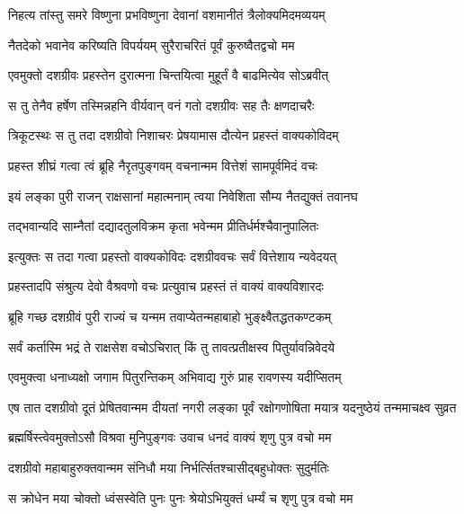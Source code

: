 \twolineshloka
{निहत्य तांस्तु समरे विष्णुना प्रभविष्णुना}
{देवानां वशमानीतं त्रैलोक्यमिदमव्ययम्} %

\twolineshloka
{नैतदेको भवानेव करिष्यति विपर्ययम्}
{सुरैराचरितं पूर्वं कुरुष्वैतद्वचो मम} %

\twolineshloka
{एवमुक्तो दशग्रीवः प्रहस्तेन दुरात्मना}
{चिन्तयित्वा मुहूर्तं वै बाढमित्येव सोऽब्रवीत्} %

\twolineshloka
{स तु तेनैव हर्षेण तस्मिन्नहनि वीर्यवान्}
{वनं गतो दशग्रीवः सह तैः क्षणदाचरैः} %

\twolineshloka
{त्रिकूटस्थः स तु तदा दशग्रीवो निशाचरः}
{प्रेषयामास दौत्येन प्रहस्तं वाक्यकोविदम्} %

\twolineshloka
{प्रहस्त शीघ्रं गत्वा त्वं ब्रूहि नैरृतपुङ्गवम्}
{वचनान्मम वित्तेशं सामपूर्वमिदं वचः} %

\twolineshloka
{इयं लङ्का पुरी राजन् राक्षसानां महात्मनाम्}
{त्वया निवेशिता सौम्य नैतद्युक्तं तवानघ} %

\twolineshloka
{तद्भवान्यदि साम्नैतां दद्यादतुलविक्रम}
{कृता भवेन्मम प्रीतिर्धर्मश्चैवानुपालितः} %

\twolineshloka
{इत्युक्तः स तदा गत्वा प्रहस्तो वाक्यकोविदः}
{दशग्रीववचः सर्वं वित्तेशाय न्यवेदयत्} %

\twolineshloka
{प्रहस्तादपि संश्रुत्य देवो वैश्रवणो वचः}
{प्रत्युवाच प्रहस्तं तं वाक्यं वाक्यविशारदः} %

\twolineshloka
{ब्रूहि गच्छ दशग्रीवं पुरी राज्यं च यन्मम}
{तवाप्येतन्महाबाहो भुङ्क्ष्वैतद्धतकण्टकम्} %

\twolineshloka
{सर्वं कर्तास्मि भद्रं ते राक्षसेश वचोऽचिरात्}
{किं तु तावत्प्रतीक्षस्व पितुर्यावन्निवेदये} %

\twolineshloka
{एवमुक्त्वा धनाध्यक्षो जगाम पितुरन्तिकम्}
{अभिवाद्य गुरुं प्राह रावणस्य यदीप्सितम्} %

\threelineshloka
{एष तात दशग्रीवो दूतं प्रेषितवान्मम}
{दीयतां नगरी लङ्का पूर्वं रक्षोगणोषिता}
{मयात्र यदनुष्ठेयं तन्ममाचक्ष्व सुव्रत} %

\twolineshloka
{ब्रह्मर्षिस्त्वेवमुक्तोऽसौ विश्रवा मुनिपुङ्गवः}
{उवाच धनदं वाक्यं शृणु पुत्र वचो मम} %

\twolineshloka
{दशग्रीवो महाबाहुरुक्तवान्मम संनिधौ}
{मया निर्भर्त्सितश्चासीद्बहुधोक्तः सुदुर्मतिः} %

\twolineshloka
{स क्रोधेन मया चोक्तो ध्वंसस्वेति पुनः पुनः}
{श्रेयोऽभियुक्तं धर्म्यं च शृणु पुत्र वचो मम} %

